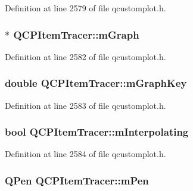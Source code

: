Definition at line 2579 of file qcustomplot.\-h.

\hypertarget{class_q_c_p_item_tracer_a2d70cf616b579563aa15f796dfc143ac}{
\subsubsection[{m\-Graph}]{$\ast$ Q\-C\-P\-Item\-Tracer\-::m\-Graph\hspace{0.3cm}{\ttfamily [protected]}}}\label{class_q_c_p_item_tracer_a2d70cf616b579563aa15f796dfc143ac}


Definition at line 2582 of file qcustomplot.\-h.

\hypertarget{class_q_c_p_item_tracer_a8fa20f2e9ee07d21fd7c8d30ba4702ca}{
\subsubsection[{m\-Graph\-Key}]{\setlength{\rightskip}{0pt plus 5cm}double Q\-C\-P\-Item\-Tracer\-::m\-Graph\-Key\hspace{0.3cm}{\ttfamily [protected]}}}\label{class_q_c_p_item_tracer_a8fa20f2e9ee07d21fd7c8d30ba4702ca}


Definition at line 2583 of file qcustomplot.\-h.

\hypertarget{class_q_c_p_item_tracer_afab37c22ad39f235921e86f93cd84595}{
\subsubsection[{m\-Interpolating}]{\setlength{\rightskip}{0pt plus 5cm}bool Q\-C\-P\-Item\-Tracer\-::m\-Interpolating\hspace{0.3cm}{\ttfamily [protected]}}}\label{class_q_c_p_item_tracer_afab37c22ad39f235921e86f93cd84595}


Definition at line 2584 of file qcustomplot.\-h.

\hypertarget{class_q_c_p_item_tracer_a579e3bd6bd16d6aaff03638dc8a99a69}{
\subsubsection[{m\-Pen}]{\setlength{\rightskip}{0pt plus 5cm}Q\-Pen Q\-C\-P\-Item\-Tracer\-::m\-Pen\hspace{0.3cm}{\ttfamily [protected]}}}\label{class_q_c_p_item_tracer_a579e3bd6bd16d6aaff03638dc8a99a69}


